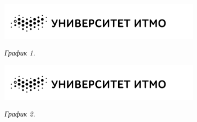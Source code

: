 \hypertarget{diagram1}{}

\begin{center}
    \includegraphics[width=10cm]{logo}

    \smallvspace

    \textit{График 1.}
\end{center}

\mediumvspace

\begin{center}
    \includegraphics[width=10cm]{logo}

    \smallvspace

    \textit{График 2.}
\end{center}